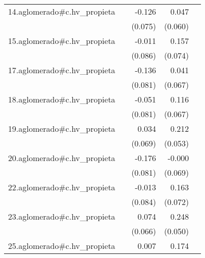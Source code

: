 {\begin{longtable}{l*{4}{D{.}{.}{-1}}}
\addlinespace
14.aglomerado#c.hv\_propieta&                     &      -0.126         &       0.047         &                     \\
            &                     &     (0.075)         &     (0.060)         &                     \\
\addlinespace
15.aglomerado#c.hv\_propieta&                     &      -0.011         &       0.157\sym{*}  &                     \\
            &                     &     (0.086)         &     (0.074)         &                     \\
\addlinespace
17.aglomerado#c.hv\_propieta&                     &      -0.136         &       0.041         &                     \\
            &                     &     (0.081)         &     (0.067)         &                     \\
\addlinespace
18.aglomerado#c.hv\_propieta&                     &      -0.051         &       0.116         &                     \\
            &                     &     (0.081)         &     (0.067)         &                     \\
\addlinespace
19.aglomerado#c.hv\_propieta&                     &       0.034         &       0.212\sym{***}&                     \\
            &                     &     (0.069)         &     (0.053)         &                     \\
\addlinespace
20.aglomerado#c.hv\_propieta&                     &      -0.176\sym{*}  &      -0.000         &                     \\
            &                     &     (0.081)         &     (0.069)         &                     \\
\addlinespace
22.aglomerado#c.hv\_propieta&                     &      -0.013         &       0.163\sym{*}  &                     \\
            &                     &     (0.084)         &     (0.072)         &                     \\
\addlinespace
23.aglomerado#c.hv\_propieta&                     &       0.074         &       0.248\sym{***}&                     \\
            &                     &     (0.066)         &     (0.050)         &                     \\
\addlinespace
25.aglomerado#c.hv\_propieta&                     &       0.007         &       0.174\sym{*}  &                     \\

\end{longtable}}

